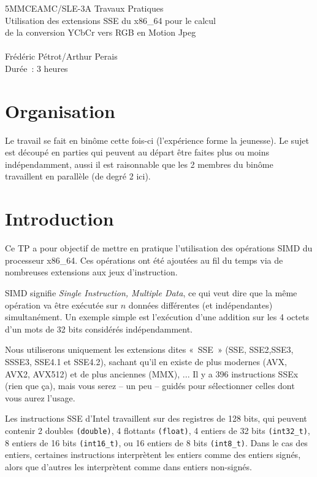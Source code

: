 \documentclass[a4paper,12pt]{article}
\begin{document}
\begin{center}
\Large
5MMCEAMC/SLE-3A Travaux Pratiques\\
Utilisation des extensions SSE du x86\_64 pour le calcul\\
de la conversion YCbCr vers RGB en Motion Jpeg\\~\\
\large
Frédéric Pétrot/Arthur Perais\\
Durée~: 3 heures
\end{center}

\section{Organisation}
Le travail se fait en binôme cette fois-ci (l'expérience forme la jeunesse).
Le sujet est découpé en parties qui peuvent au départ être faites plus ou moins indépendamment, aussi il est raisonnable que les 2 membres du binôme travaillent en parallèle (de degré 2 ici).


\section{Introduction}
Ce TP a pour objectif de mettre en pratique l'utilisation des opérations SIMD du processeur x86\_64. Ces opérations ont été ajoutées au fil du temps via de nombreuses extensions aux jeux d'instruction.

SIMD signifie \emph{Single Instruction, Multiple Data}, ce qui veut dire que la même opération va être exécutée sur $n$ données différentes (et indépendantes) simultanément.
Un exemple simple est l'exécution d'une addition sur les 4 octets d'un mots de 32 bits considérés indépendamment.

Nous utiliserons uniquement les extensions dites «~SSE~» (SSE, SSE2,SSE3, SSSE3, SSE4.1 et SSE4.2), sachant qu'il en existe de plus modernes (AVX, AVX2, AVX512) et de plus anciennes (MMX), ...
Il y a 396 instructions SSEx (rien que ça), mais vous serez -- un peu -- guidés pour sélectionner celles dont vous aurez l'usage.


Les instructions SSE d'Intel travaillent sur des registres de 128 bits, qui peuvent contenir 2 doubles \lstinline{(double)}, 4 flottants \lstinline{(float)}, 4 entiers de 32 bits \lstinline{(int32_t)}, 8 entiers de 16 bits \lstinline{(int16_t)}, ou 16 entiers de 8 bits \lstinline{(int8_t)}. Dans le cas des entiers, certaines instructions interprètent les entiers comme des entiers signés, alors que d'autres les interprètent comme dans entiers non-signés. 
	
\end{document}

